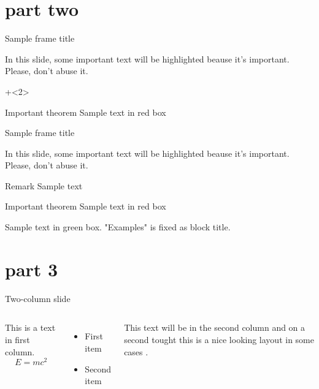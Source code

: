 \documentclass[10pt]{beamer}	%
\begin{document}
\section{part two}

\begin{frame}[t]{Sample frame title}{}
	
	In this slide, some important text will be
	\alert<2->{highlighted} beause it's important.
	Please, don't abuse it.
	
	
	
	\onslide+<2>{	%
	\begin{alertblock}{Important theorem}
	Sample text in red box
	\end{alertblock}
	}
	
\end{frame}

\begin{frame}[plain]{Sample frame title}{}
	
	In this slide, some important text will be
	\alert{highlighted} beause it's important.
	Please, don't abuse it.
	
	\begin{block}{Remark}
	Sample text
	\end{block}
	
	\begin{alertblock}{Important theorem}
	Sample text in red box
	\end{alertblock}
	
	\begin{examples}
	Sample text in green box. "Examples" is fixed as block title.
	\end{examples}
\end{frame}

\section{part 3}

\begin{frame}{Two-column slide}{}
	\begin{columns}[t]
		This is a text in first column.
		$$E=mc^2$$
		\begin{itemize}
		\item First item
		\item Second item
		\end{itemize}
		
		This text will be in the second column
		and on a second tought this is a nice looking
		layout in some cases \citep{Venzmer2018}.
	\end{columns}
\end{frame}
\end{document}
